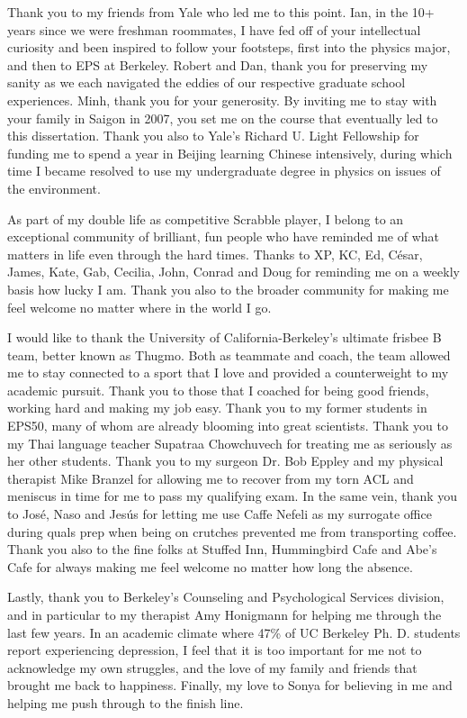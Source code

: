 \documentclass{ucbthesis}
\begin{document}
\begin{frontmatter}
\begin{acknowledgements}
Thank you to my friends from Yale who led me to this point. Ian, in the 10+ years since we were freshman roommates, I have fed off of your intellectual curiosity and been inspired to follow your footsteps, first into the physics major, and then to EPS at Berkeley. Robert and Dan, thank you for preserving my sanity as we each navigated the eddies of our respective graduate school experiences. Minh, thank you for your generosity. By inviting me to stay with your family in Saigon in 2007, you set me on the course that eventually led to this dissertation. Thank you also to Yale's Richard U. Light Fellowship for funding me to spend a year in Beijing learning Chinese intensively, during which time I became resolved to use my undergraduate degree in physics on issues of the environment.

As part of my double life as competitive Scrabble player, I belong to an exceptional community of brilliant, fun people who have reminded me of what matters in life even through the hard times. Thanks to XP, KC, Ed, C\'{e}sar, James, Kate, Gab, Cecilia, John, Conrad and Doug for reminding me on a weekly basis how lucky I am. Thank you also to the broader community for making me feel welcome no matter where in the world I go.

I would like to thank the University of California-Berkeley's ultimate frisbee B team, better known as Thugmo. Both as teammate and coach, the team allowed me to stay connected to a sport that I love and provided a counterweight to my academic pursuit. Thank you to those that I coached for being good friends, working hard and making my job easy. Thank you to my former students in EPS50, many of whom are already blooming into great scientists. Thank you to my Thai language teacher Supatraa Chowchuvech for treating me as seriously as her other students. Thank you to my surgeon Dr. Bob Eppley and my physical therapist Mike Branzel for allowing me to recover from my torn ACL and meniscus in time for me to pass my qualifying exam. In the same vein, thank you to Jos\'{e}, Naso and Jes\'{u}s for letting me use Caffe Nefeli as my surrogate office during quals prep when being on crutches prevented me from transporting coffee. Thank you also to the fine folks at Stuffed Inn, Hummingbird Cafe and Abe's Cafe for always making me feel welcome no matter how long the absence.

Lastly, thank you to Berkeley's Counseling and Psychological Services division, and in particular to my therapist Amy Honigmann for helping me through the last few years. In an academic climate where 47\% of UC Berkeley Ph. D. students report experiencing depression, I feel that it is too important for me not to acknowledge my own struggles, and the love of my family and friends that brought me back to happiness. Finally, my love to Sonya for believing in me and helping me push through to the finish line.

\end{acknowledgements}

\end{frontmatter}
\end{document}
